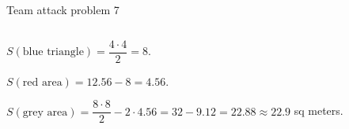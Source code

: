 \documentclass[9pt,aspectratio=169]{beamer}
\begin{document}
\begin{frame}{Team attack problem 7}
\begin{columns}[T]
\begin{column}{0.5\textwidth}
      $S(\text{blue triangle}) = \dfrac{4\cdot 4}{2} = 8$.
      
      $S(\text{red area}) = 12.56 - 8 = 4.56$.

      $S(\text{grey area}) = \dfrac{8 \cdot 8}{2} - 2 \cdot 4.56 = 32 - 9.12 = 22.88 \approx \boxed{22.9}$ sq meters.
    \end{column}
    \begin{column}{0.5\textwidth}
    \end{column}
  \end{columns}
\end{frame}

\end{document}
